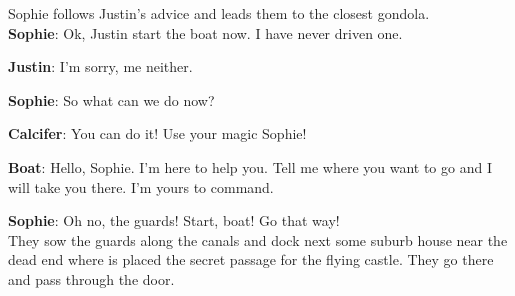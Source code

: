 \noindent Sophie follows Justin's advice and leads them to the closest gondola.\\

\textbf{Sophie}: Ok, Justin start the boat now. I have never driven one.

\textbf{Justin}: I’m sorry, me neither.

\textbf{Sophie}: So what can we do now?

\textbf{Calcifer}: You can do it! Use your magic Sophie!

\textbf{Boat}: Hello, Sophie. I’m here to help you. Tell me where you want to go and I will take you there. I’m yours to command.

\textbf{Sophie}: Oh no, the guards! Start, boat! Go that way!\\

\noindent They sow the guards along the canals and dock next some suburb house near the dead end where is placed the secret passage for the flying castle. They go there and pass through the door.
